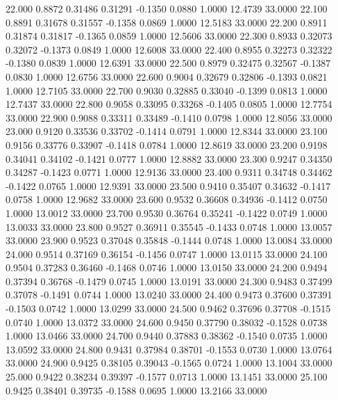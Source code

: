  22.000   0.8872   0.31486   0.31291  -0.1350   0.0880   1.0000  12.4739  33.0000
  22.100   0.8891   0.31678   0.31557  -0.1358   0.0869   1.0000  12.5183  33.0000
  22.200   0.8911   0.31874   0.31817  -0.1365   0.0859   1.0000  12.5606  33.0000
  22.300   0.8933   0.32073   0.32072  -0.1373   0.0849   1.0000  12.6008  33.0000
  22.400   0.8955   0.32273   0.32322  -0.1380   0.0839   1.0000  12.6391  33.0000
  22.500   0.8979   0.32475   0.32567  -0.1387   0.0830   1.0000  12.6756  33.0000
  22.600   0.9004   0.32679   0.32806  -0.1393   0.0821   1.0000  12.7105  33.0000
  22.700   0.9030   0.32885   0.33040  -0.1399   0.0813   1.0000  12.7437  33.0000
  22.800   0.9058   0.33095   0.33268  -0.1405   0.0805   1.0000  12.7754  33.0000
  22.900   0.9088   0.33311   0.33489  -0.1410   0.0798   1.0000  12.8056  33.0000
  23.000   0.9120   0.33536   0.33702  -0.1414   0.0791   1.0000  12.8344  33.0000
  23.100   0.9156   0.33776   0.33907  -0.1418   0.0784   1.0000  12.8619  33.0000
  23.200   0.9198   0.34041   0.34102  -0.1421   0.0777   1.0000  12.8882  33.0000
  23.300   0.9247   0.34350   0.34287  -0.1423   0.0771   1.0000  12.9136  33.0000
  23.400   0.9311   0.34748   0.34462  -0.1422   0.0765   1.0000  12.9391  33.0000
  23.500   0.9410   0.35407   0.34632  -0.1417   0.0758   1.0000  12.9682  33.0000
  23.600   0.9532   0.36608   0.34936  -0.1412   0.0750   1.0000  13.0012  33.0000
  23.700   0.9530   0.36764   0.35241  -0.1422   0.0749   1.0000  13.0033  33.0000
  23.800   0.9527   0.36911   0.35545  -0.1433   0.0748   1.0000  13.0057  33.0000
  23.900   0.9523   0.37048   0.35848  -0.1444   0.0748   1.0000  13.0084  33.0000
  24.000   0.9514   0.37169   0.36154  -0.1456   0.0747   1.0000  13.0115  33.0000
  24.100   0.9504   0.37283   0.36460  -0.1468   0.0746   1.0000  13.0150  33.0000
  24.200   0.9494   0.37394   0.36768  -0.1479   0.0745   1.0000  13.0191  33.0000
  24.300   0.9483   0.37499   0.37078  -0.1491   0.0744   1.0000  13.0240  33.0000
  24.400   0.9473   0.37600   0.37391  -0.1503   0.0742   1.0000  13.0299  33.0000
  24.500   0.9462   0.37696   0.37708  -0.1515   0.0740   1.0000  13.0372  33.0000
  24.600   0.9450   0.37790   0.38032  -0.1528   0.0738   1.0000  13.0466  33.0000
  24.700   0.9440   0.37883   0.38362  -0.1540   0.0735   1.0000  13.0592  33.0000
  24.800   0.9431   0.37984   0.38701  -0.1553   0.0730   1.0000  13.0764  33.0000
  24.900   0.9425   0.38105   0.39043  -0.1565   0.0724   1.0000  13.1004  33.0000
  25.000   0.9422   0.38234   0.39397  -0.1577   0.0713   1.0000  13.1451  33.0000
  25.100   0.9425   0.38401   0.39735  -0.1588   0.0695   1.0000  13.2166  33.0000
